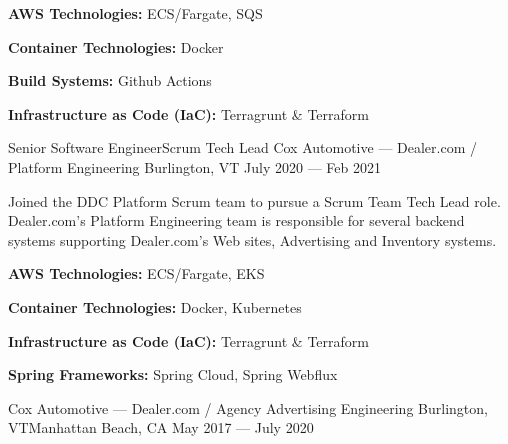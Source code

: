 \vspace{-2.00mm}
\begin{cventries}
    {} %
    {} %
    {} %
    {%
      \begin{cvitems} %
        \item {\textbf{AWS Technologies:} ECS/Fargate, SQS}
        \item {\textbf{Container Technologies:} Docker}
        \item {\textbf{Build Systems:} Github Actions}
        \item {\textbf{Infrastructure as Code (IaC):} Terragrunt \& Terraform}
      \end{cvitems}
    }

  \cventry
    {Senior Software Engineer{\enskip\cdotp\enskip}Scrum Tech Lead} %
    {Cox Automotive --- Dealer.com / Platform Engineering} %
    {Burlington, VT} %
    {July 2020 --- Feb 2021} %
    {}
\end{cventries}
\vspace{-6.00mm}

\begin{cvparagraph}
Joined the DDC Platform Scrum team to pursue a Scrum Team Tech Lead role. Dealer.com's Platform Engineering team is responsible for several backend systems supporting Dealer.com's Web sites, Advertising and Inventory systems.
\end{cvparagraph}

\vspace{-2.00mm}
\begin{cventries}
    {} %
    {} %
    {} %
    {%
      \begin{cvitems} %
        \item {\textbf{AWS Technologies:} ECS/Fargate, EKS}
        \item {\textbf{Container Technologies:} Docker, Kubernetes}
        \item {\textbf{Infrastructure as Code (IaC):} Terragrunt \& Terraform}
        \item {\textbf{Spring Frameworks:} Spring Cloud, Spring Webflux}
      \end{cvitems}
    }


    {Cox Automotive --- Dealer.com / Agency Advertising Engineering} %
    {Burlington, VT{\vspace{1mm}\newline}Manhattan Beach, CA} %
    {May 2017 --- July 2020} %
    {}
\end{cventries}
\vspace{-6.00mm}

